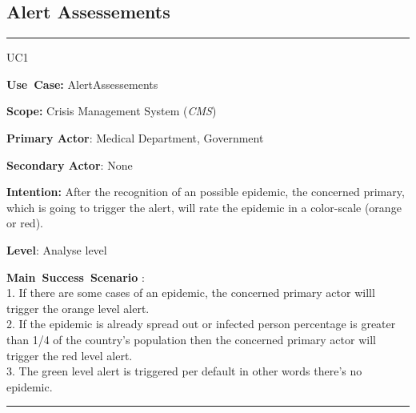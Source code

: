 \subsection{Alert Assessements}
\vspace{0.5cm}
\hrule
\vspace{0.5cm}
\begin{lyxlist}{UC1}
\small{
\item [\textbf{Use~Case:}] AlertAssessements
\item [\textbf{Scope:}] Crisis Management System (\emph{CMS})
\item [\textbf{Primary Actor}:] Medical Department, Government
\item [\textbf{Secondary Actor}:] None
\item [\textbf{Intention:}] After the recognition of an possible epidemic, the
concerned primary, which is going to trigger the alert, will rate the epidemic
in a color-scale (orange or red).\\
\item [\textbf{Level}:]Analyse level
\item [\textbf{Main~Success~Scenario}]:\\
1. If there are some cases of an epidemic, the concerned primary actor willl
trigger the orange level alert.\\
2. If the epidemic is already spread out or infected person percentage is
greater than 1/4 of the country's population then the concerned primary actor
will trigger the red level alert.\\
3. The green level alert is triggered per default in other words there's no
epidemic.\\ }
\end{lyxlist}
\hrule
\vspace{0.5cm} 

